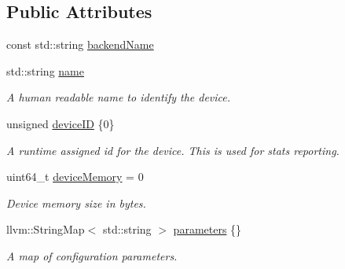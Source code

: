 \subsection*{Public Attributes}
\begin{DoxyCompactItemize}
\item 
const std\+::string \hyperlink{structglow_1_1runtime_1_1_device_config_af0b3f3f4020ac329221ee3e635405ba3}{backend\+Name}
\item 
\mbox{\label{structglow_1_1runtime_1_1_device_config_a70b19bb94502b91856a2dd264fb066ac}} 
std\+::string \hyperlink{structglow_1_1runtime_1_1_device_config_a70b19bb94502b91856a2dd264fb066ac}{name}
\begin{DoxyCompactList}\small\item\em A human readable name to identify the device. \end{DoxyCompactList}\item 
\mbox{\label{structglow_1_1runtime_1_1_device_config_a2209bcd879ef987ae7a2b3a35b8f571a}} 
unsigned \hyperlink{structglow_1_1runtime_1_1_device_config_a2209bcd879ef987ae7a2b3a35b8f571a}{device\+ID} \{0\}
\begin{DoxyCompactList}\small\item\em A runtime assigned id for the device. This is used for stats reporting. \end{DoxyCompactList}\item 
\mbox{\label{structglow_1_1runtime_1_1_device_config_a802184b480686cc2cadd76ab8ee02d36}} 
uint64\+\_\+t \hyperlink{structglow_1_1runtime_1_1_device_config_a802184b480686cc2cadd76ab8ee02d36}{device\+Memory} = 0
\begin{DoxyCompactList}\small\item\em Device memory size in bytes. \end{DoxyCompactList}\item 
\mbox{\label{structglow_1_1runtime_1_1_device_config_abf420dfceeecb9303fe3b8668c9da723}} 
llvm\+::\+String\+Map$<$ std\+::string $>$ \hyperlink{structglow_1_1runtime_1_1_device_config_abf420dfceeecb9303fe3b8668c9da723}{parameters} \{\}
\begin{DoxyCompactList}\small\item\em A map of configuration parameters. \end{DoxyCompactList}\end{DoxyCompactItemize}



